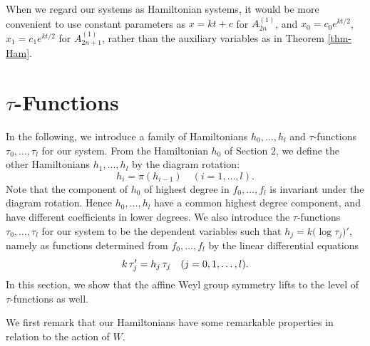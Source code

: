 \begin{rem}
When we regard our systems as Hamiltonian systems, it would be more convenient 
to use constant parameters as $x=k t+c$ for $A^{(1)}_{2n}$, and 
$x_0=c_0 e^{kt/2}$, $x_1=c_1 e^{kt/2}$ for $A^{(1)}_{2n+1}$,
rather than the auxiliary variables as in Theorem \ref{thm-Ham}. 
\end{rem}


\section{$\tau$-Functions}

In the following, we introduce a family of Hamiltonians $h_0,\ldots,h_l$ and 
$\tau$-functions $\tau_0,\ldots,\tau_l$ for our system. 
From the Hamiltonian $h_0$ of Section 2,  
we define the other Hamiltonians $h_1,\ldots,h_l$
by the diagram rotation:
\begin{equation}
h_i=\pi(h_{i-1})\quad (i=1,\ldots,l).
\end{equation}
Note that the component of $h_0$ of highest degree in $f_0,\ldots,f_l$ 
is invariant under the diagram rotation.  Hence $h_0,\ldots,h_l$
have a common highest degree component, and have different coefficients 
in lower degrees. 
We also introduce the $\tau$-functions $\tau_0,\ldots,\tau_l$ for our system 
to be the dependent variables such that $h_j=k \big(\log \tau_j \big)'$, namely 
as functions determined from $f_0,\ldots,f_l$ by the linear differential equations
\begin{equation}\Label{tau-h}
k \, \tau_j '= h_j \, \tau_j \quad(j=0,1,\ldots,l).
\end{equation}
In this section, we show that the affine Weyl group symmetry lifts to the level 
of $\tau$-functions as well. 

We first remark that 
our Hamiltonians have some remarkable properties in relation to the action of $W$. 


